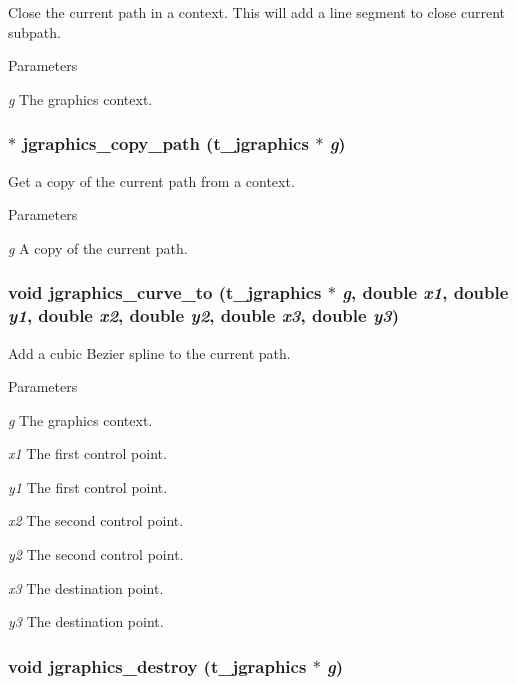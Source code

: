 Close the current path in a context. This will add a line segment to close current subpath.


\begin{DoxyParams}{Parameters}
\item[{\em g}]The graphics context. \end{DoxyParams}
\hypertarget{group__jgraphics_ga356f39bed1d63fcf843fe05b6dc861b0}{
\subsubsection[{jgraphics\_\-copy\_\-path}]{$\ast$ jgraphics\_\-copy\_\-path ({\bf t\_\-jgraphics} $\ast$ {\em g})}}
\label{group__jgraphics_ga356f39bed1d63fcf843fe05b6dc861b0}


Get a copy of the current path from a context. 
\begin{DoxyParams}{Parameters}
\item[{\em g}]A copy of the current path. \end{DoxyParams}
\hypertarget{group__jgraphics_ga893fefbf4f38bb4b3b83850c21f8b836}{
\subsubsection[{jgraphics\_\-curve\_\-to}]{\setlength{\rightskip}{0pt plus 5cm}void jgraphics\_\-curve\_\-to ({\bf t\_\-jgraphics} $\ast$ {\em g}, \/  double {\em x1}, \/  double {\em y1}, \/  double {\em x2}, \/  double {\em y2}, \/  double {\em x3}, \/  double {\em y3})}}
\label{group__jgraphics_ga893fefbf4f38bb4b3b83850c21f8b836}


Add a cubic Bezier spline to the current path. 
\begin{DoxyParams}{Parameters}
\item[{\em g}]The graphics context. \item[{\em x1}]The first control point. \item[{\em y1}]The first control point. \item[{\em x2}]The second control point. \item[{\em y2}]The second control point. \item[{\em x3}]The destination point. \item[{\em y3}]The destination point. \end{DoxyParams}
\hypertarget{group__jgraphics_ga910977684c0f03be9edfb9f861905d5e}{
\subsubsection[{jgraphics\_\-destroy}]{\setlength{\rightskip}{0pt plus 5cm}void jgraphics\_\-destroy ({\bf t\_\-jgraphics} $\ast$ {\em g})}}
\label{group__jgraphics_ga910977684c0f03be9edfb9f861905d5e}


